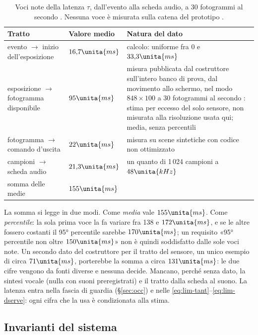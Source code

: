 \begin{table}[H]\centering\small
\caption{Voci note della latenza $\tau$, dall'evento alla scheda audio, a 30 fotogrammi al secondo . Nessuna voce è misurata sulla catena del prototipo .}\label{tab:lim-latenza}
\begin{tabularx}{\linewidth}{@{}p{5.2cm}p{2.0cm}L@{}}
\toprule
Tratto & Valore medio & Natura del dato\\
\midrule
evento $\to$ inizio dell'esposizione & $16{,}7\unita{ms}$ & calcolo: uniforme fra 0 e $33{,}3\unita{ms}$\\
esposizione $\to$ fotogramma disponibile & $95\unita{ms}$ & misura pubblicata dal costruttore sull'intero banco di prova, dal movimento allo schermo, nel modo $848\times100$ a 30 fotogrammi al secondo \cite{realsense-alta-velocita-d435}: stima per eccesso del solo sensore, non misurata alla risoluzione usata qui; media, senza percentili\\
fotogramma $\to$ comando d'uscita & $22\unita{ms}$ & misura su scene sintetiche con codice non ottimizzato\\
campioni $\to$ scheda audio & $21{,}3\unita{ms}$ & un quanto di 1\,024 campioni a $48\unita{kHz}$\\
\midrule
somma delle medie & $155\unita{ms}$ & \\
\bottomrule
\end{tabularx}
\end{table}

La somma si legge in due modi. Come \emph{media} vale $155\unita{ms}$. Come \emph{percentile}: la sola prima voce la fa variare fra 138 e $172\unita{ms}$, e se le altre fossero costanti il 95° percentile sarebbe $170\unita{ms}$; un requisito «95° percentile non oltre $150\unita{ms}$» non è quindi soddisfatto dalle sole voci note. Un secondo dato del costruttore per il tratto del sensore, un unico esempio di circa $71\unita{ms}$, porterebbe la somma a circa $131\unita{ms}$: le due cifre vengono da fonti diverse e nessuna decide. Mancano, perché senza dato, la sintesi vocale (nulla con suoni preregistrati) e il tratto dalla scheda al suono. La latenza entra nella fascia di guardia (\S\ref{sec:occ}) e nelle \eqref{eq:lim-tant}--\eqref{eq:lim-dserve}: ogni cifra che la usa è condizionata alla stima.

\subsection{Invarianti del sistema}\label{sec:lim-invarianti}

